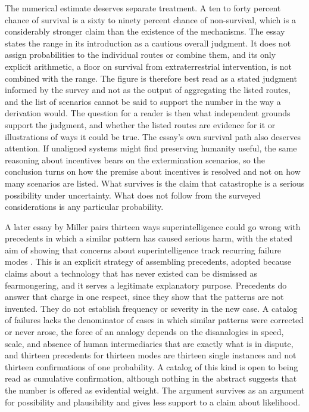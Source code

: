\documentclass[11pt]{article}
\begin{document}
The numerical estimate deserves separate treatment. A ten to forty percent chance of survival is a sixty to ninety percent chance of non-survival, which is a considerably stronger claim than the existence of the mechanisms. The essay states the range in its introduction as a cautious overall judgment. It does not assign probabilities to the individual routes or combine them, and its only explicit arithmetic, a floor on survival from extraterrestrial intervention, is not combined with the range. The figure is therefore best read as a stated judgment informed by the survey and not as the output of aggregating the listed routes, and the list of scenarios cannot be said to support the number in the way a derivation would. The question for a reader is then what independent grounds support the judgment, and whether the listed routes are evidence for it or illustrations of ways it could be true. The essay's own survival path also deserves attention. If unaligned systems might find preserving humanity useful, the same reasoning about incentives bears on the extermination scenarios, so the conclusion turns on how the premise about incentives is resolved and not on how many scenarios are listed. What survives is the claim that catastrophe is a serious possibility under uncertainty. What does not follow from the surveyed considerations is any particular probability.

A later essay by Miller pairs thirteen ways superintelligence could go wrong with precedents in which a similar pattern has caused serious harm, with the stated aim of showing that concerns about superintelligence track recurring failure modes \citep{miller2025}. This is an explicit strategy of assembling precedents, adopted because claims about a technology that has never existed can be dismissed as fearmongering, and it serves a legitimate explanatory purpose. Precedents do answer that charge in one respect, since they show that the patterns are not invented. They do not establish frequency or severity in the new case. A catalog of failures lacks the denominator of cases in which similar patterns were corrected or never arose, the force of an analogy depends on the disanalogies in speed, scale, and absence of human intermediaries that are exactly what is in dispute, and thirteen precedents for thirteen modes are thirteen single instances and not thirteen confirmations of one probability. A catalog of this kind is open to being read as cumulative confirmation, although nothing in the abstract suggests that the number is offered as evidential weight. The argument survives as an argument for possibility and plausibility and gives less support to a claim about likelihood.
\end{document}
